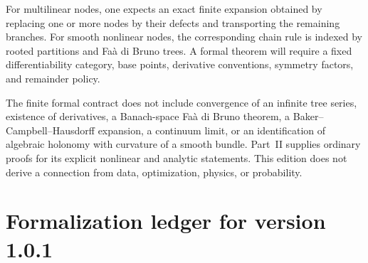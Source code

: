 \begin{roadmap}
\label{roadmap:tree-defect}
For multilinear nodes, one expects an exact finite expansion obtained by
replacing one or more nodes by their defects and transporting the remaining
branches.  For smooth nonlinear nodes, the corresponding chain rule is
indexed by rooted partitions and Fa\`a di Bruno trees.  A formal theorem will
require a fixed differentiability category, base points, derivative
conventions, symmetry factors, and remainder policy.
\end{roadmap}

\begin{boundary}
The finite formal contract does not include convergence of an infinite tree series, existence
of derivatives, a Banach-space Fa\`a di Bruno theorem, a Baker--Campbell--Hausdorff
expansion, a continuum limit, or an identification of algebraic holonomy with
curvature of a smooth bundle. Part~II supplies ordinary proofs for its explicit nonlinear and analytic statements. This edition does not derive a connection from
data, optimization, physics, or probability.
\end{boundary}

\section{Formalization ledger for version 1.0.1}
\label{sec:ledger}


